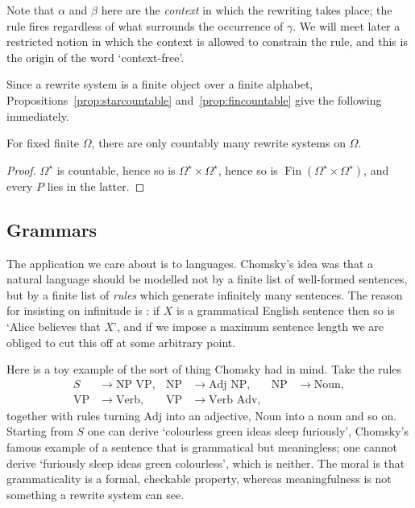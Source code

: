 \documentclass[a4paper]{scrartcl}
\newcommand{\Fin}{\operatorname{Fin}}
\begin{document}
Note that $\alpha$ and $\beta$ here are the \emph{context} in which the rewriting takes place; the rule fires regardless of what surrounds the occurrence of $\gamma$. We will meet later a restricted notion in which the context is allowed to constrain the rule, and this is the origin of the word `context-free'.

Since a rewrite system is a finite object over a finite alphabet, Propositions~\ref{prop:starcountable} and~\ref{prop:fincountable} give the following immediately.

\begin{proposition}
	For fixed finite $\Omega$, there are only countably many rewrite systems on $\Omega$.
\end{proposition}

\begin{proof}
	$\Omega^\star$ is countable, hence so is $\Omega^\star \times \Omega^\star$, hence so is $\Fin(\Omega^\star \times \Omega^\star)$, and every $P$ lies in the latter.
\end{proof}

\subsection{Grammars}

The application we care about is to languages. Chomsky's idea was that a natural language should be modelled not by a finite list of well-formed sentences, but by a finite list of \emph{rules} which generate infinitely many sentences. The reason for insisting on infinitude is : if $X$ is a grammatical English sentence then so is `Alice believes that $X$', and if we impose a maximum sentence length we are obliged to cut this off at some arbitrary point.

Here is a toy example of the sort of thing Chomsky had in mind. Take the rules
\begin{align*}
	S &\to \text{NP VP}, & \text{NP} &\to \text{Adj NP}, & \text{NP} &\to \text{Noun}, \\
	\text{VP} &\to \text{Verb}, & \text{VP} &\to \text{Verb Adv},
\end{align*}
together with rules turning $\text{Adj}$ into an adjective, $\text{Noun}$ into a noun and so on. Starting from $S$ one can derive `colourless green ideas sleep furiously', Chomsky's famous example of a sentence that is grammatical but meaningless; one cannot derive `furiously sleep ideas green colourless', which is neither. The moral is that grammaticality is a formal, checkable property, whereas meaningfulness is not something a rewrite system can see.
\end{document}
